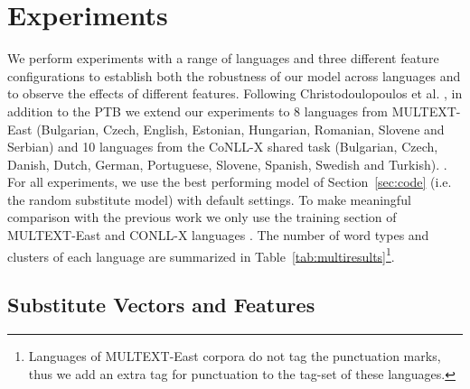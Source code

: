 \section{Experiments}
\label{sec:multilang}
\noindent We perform experiments with a range of languages and three
different feature configurations to establish both the robustness of
our model across languages and to observe the effects of different
features.  Following Christodoulopoulos et
al. , in
addition to the PTB we extend our experiments to 8 languages from
MULTEXT-East (Bulgarian, Czech, English, Estonian, Hungarian,
Romanian, Slovene and Serbian) \cite{citeulike:5820223} and 10
languages from the CoNLL-X shared task (Bulgarian, Czech, Danish,
Dutch, German, Portuguese, Slovene, Spanish, Swedish and Turkish).
\cite{Buchholz:2006:CST:1596276.1596305}.  For all experiments, we use
the best performing model of Section~\ref{sec:code} (i.e. the random
substitute model) with default settings.  To make meaningful
comparison with the previous work we only use the training section of
MULTEXT-East and CONLL-X languages
\cite{Lee:2010:STU:1870658.1870741}.  The number of word types and
clusters of each language are summarized in
Table~\ref{tab:multiresults}\footnote{Languages of MULTEXT-East
  corpora do not tag the punctuation marks, thus we add an extra tag
  for punctuation to the tag-set of these languages.}.

\subsection{Substitute Vectors and Features}

